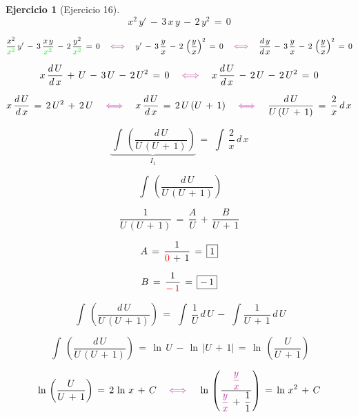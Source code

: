 \documentclass[a4paper,11pt]{book}
\newtheorem{ejer}{Ejercicio}[section]
\begin{document}
\begin{ejer}[Ejercicio 16] 

  $$x^{2}\,y'\,-\,3\,x\,y\,-\,2\,y^{2}\,=\,0$$ 


 $$\dfrac{x^{2}}{\textcolor{green}{x^{2}} }\,y'\,-\,3\,\dfrac{x\,y}{\textcolor{green}{x^{2}}}\,-\,2\,\dfrac{y^{2}}{\textcolor{green}{x^{2}}}\,=\,0 \quad \textcolor{byzantine}{\iff} \quad y'\,-\,3\,\dfrac{y}{x}\,-\,2\,\left(\dfrac{y}{x} \right)^{2}\,=\,0 \quad \textcolor{byzantine}{\iff} \quad \dfrac{d\,y}{d\,x}\,-\,3\,\dfrac{y}{x}\,-\,2\,\left(\dfrac{y}{x} \right)^{2}\,=\,0$$ 

 $$x\,\dfrac{d\,U}{d\,x}\,+\,U\,-\,3\,U\,-\,2\,U^{2}\,=\,0 \quad \textcolor{byzantine}{\iff} \quad x\,\dfrac{d\,U}{d\,x}\,-\,2\,U\,-\,2\,U^{2}\,=\,0$$ 

 $$x\,\dfrac{d\,U}{d\,x}\,=\,2\,U^{2}\,+\,2\,U \quad \textcolor{byzantine}{\iff} \quad x\,\dfrac{d\,U}{d\,x}\,=\,2\,U\,(U\,+\,1) \quad \textcolor{byzantine}{\iff} \quad \dfrac{d\,U}{U\,(U\,+\,1)}\,=\,\dfrac{2}{x}\,d\,x$$ 

$$\underbrace{\displaystyle\,\int\,\left(\dfrac{d\,U}{U\,(U\,+\,1)} \right)}_{I_{1}}\,=\,\displaystyle\,\int\,\dfrac{2}{x}\,d\,x$$ 

\begin{tcolorbox}[colback=red!5!white,colframe=red!75!black,fonttitle=\bfseries,title=$I_{1}$]  

$$\displaystyle\,\int\,\left(\dfrac{d\,U}{U\,(U\,+\,1)} \right)$$ 

$$\dfrac{1}{U\,(U\,+\,1)}\,=\,\dfrac{A}{U}\,+\,\dfrac{B}{U\,+\,1}$$ 

$$A\,=\,\dfrac{1}{\textcolor{red}{0}\,+\,1}\,=\,\boxed{1}$$ 

$$B\,=\,\dfrac{1}{\textcolor{red}{-\,1}}\,=\,\boxed{-\,1}$$ 

$$\displaystyle\,\int\,\left(\dfrac{d\,U}{U\,(U\,+\,1)} \right)\,=\,\displaystyle\,\int\,\dfrac{1}{U}\,d\,U\,-\,\displaystyle\,\int\dfrac{1}{U\,+\,1}\,d\,U$$ 

$$\displaystyle\,\int\,\left(\dfrac{d\,U}{U\,(U\,+\,1)} \right)\,=\,\ln\,U\,-\,\ln\,|U\,+\,1|\,=\,\boxed{\ln\,\left(\dfrac{U}{U\,+\,1} \right)}$$ 

\end{tcolorbox}  

 $$\ln\,\left(\dfrac{U}{U\,+\,1} \right)\,=\,2\,\ln\,x\,+\,C \quad \textcolor{byzantine}{\iff} \quad \ln\,\left(\dfrac{\textcolor{byzantine}{\dfrac{y}{x}}}{\textcolor{byzantine}{\dfrac{y}{x}}\,+\,\dfrac{1}{1} } \right)\,=\,\ln\,x^{2}\,+\,C$$ 


\end{ejer}
\end{document}
